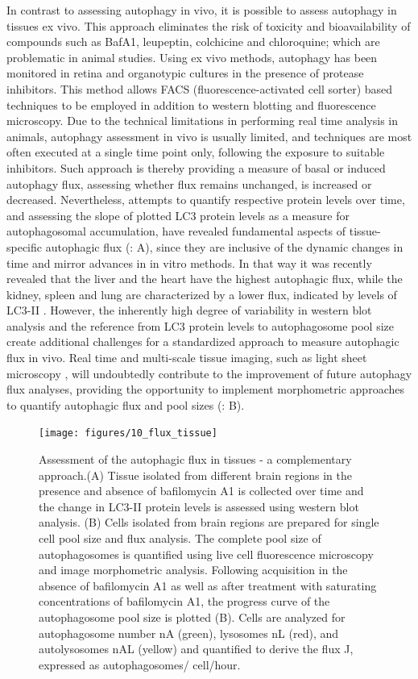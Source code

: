 In contrast to assessing autophagy in vivo, it is possible to assess autophagy in tissues ex vivo. This approach eliminates the risk of toxicity and bioavailability of compounds such as BafA1, leupeptin, colchicine and chloroquine; which are problematic in animal studies. Using ex vivo methods, autophagy has been monitored in retina \citep{Esteban-Martinez2015} and organotypic cultures in the presence of protease inhibitors. This method allows FACS (fluorescence-activated cell sorter) based techniques to be employed in addition to western blotting and fluorescence microscopy. Due to the technical limitations in performing real time analysis in animals, autophagy assessment in vivo is usually limited, and techniques are most often executed at a single time point only, following the exposure to suitable inhibitors. Such approach is thereby providing a measure of basal or induced autophagy flux, assessing whether flux remains unchanged, is increased or decreased. Nevertheless, attempts to quantify respective protein levels over time, and assessing the slope of plotted LC3 protein levels as a measure for autophagosomal accumulation, have revealed fundamental aspects of tissue- specific autophagic flux \citep{Haspel2011} (: A), since they are inclusive of the dynamic changes in time and mirror advances in in vitro methods. In that way it was recently revealed that the liver and the heart have the highest autophagic flux, while the kidney, spleen and lung are characterized by a lower flux, indicated by levels of LC3-II \citep{Haspel2011}. However, the inherently high degree of variability in western blot analysis and the reference from LC3 protein levels to autophagosome pool size create additional challenges for a standardized approach to measure autophagic flux in vivo. Real time and multi-scale tissue imaging, such as light sheet microscopy \citep{Pampaloni2013}, will undoubtedly contribute to the improvement of future autophagy flux analyses, providing the opportunity to implement morphometric approaches to quantify autophagic flux and pool sizes (: B). 

\begin{figure}[!htbp]
  \texttt{[image: figures/10\_flux\_tissue]}
  \caption{Assessment of the autophagic flux in tissues - a complementary approach.(A) Tissue isolated from different brain regions in the presence and absence of bafilomycin A1 is collected over time and the change in LC3-II protein levels is assessed using western blot analysis. (B) Cells isolated from brain regions are prepared for single cell pool size and flux analysis. The complete pool size of autophagosomes is quantified using live cell fluorescence microscopy and image morphometric analysis. Following acquisition in the absence of bafilomycin A1 as well as after treatment with saturating concentrations of bafilomycin A1, the progress curve of the autophagosome pool size is plotted (B). Cells are analyzed for autophagosome number nA (green), lysosomes nL (red), and autolysosomes nAL (yellow) and quantified to derive the flux J, expressed as autophagosomes/ cell/hour.}
  \label{fig:10_flux_tissue}
\end{figure}

